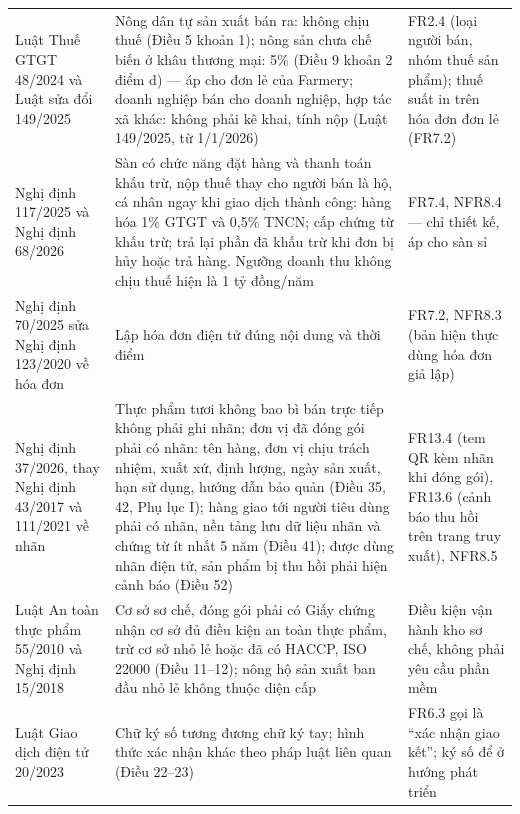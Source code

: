 \begin{longtable}{L{3.50cm} L{6.70cm} L{4.70cm}}
Luật Thuế GTGT 48/2024 và Luật sửa đổi 149/2025 \parencite{luatgtgt2024, luat149_2025} & Nông dân tự sản xuất bán ra: không chịu thuế (Điều 5 khoản 1); nông sản chưa chế biến ở khâu thương mại: 5\% (Điều 9 khoản 2 điểm d) --- áp cho đơn lẻ của Farmery; doanh nghiệp bán cho doanh nghiệp, hợp tác xã khác: không phải kê khai, tính nộp (Luật 149/2025, từ 1/1/2026) & FR2.4 (loại người bán, nhóm thuế sản phẩm); thuế suất in trên hóa đơn đơn lẻ (FR7.2) \\
Nghị định 117/2025 và Nghị định 68/2026 \parencite{nd117_2025, nd68_2026} & Sàn có chức năng đặt hàng và thanh toán khấu trừ, nộp thuế thay cho người bán là hộ, cá nhân ngay khi giao dịch thành công: hàng hóa 1\% GTGT và 0,5\% TNCN; cấp chứng từ khấu trừ; trả lại phần đã khấu trừ khi đơn bị hủy hoặc trả hàng. Ngưỡng doanh thu không chịu thuế hiện là 1 tỷ đồng/năm \parencite{nd141_2026} & FR7.4, NFR8.4 --- chỉ thiết kế, áp cho sàn sỉ \\
Nghị định 70/2025 sửa Nghị định 123/2020 về hóa đơn \parencite{nd70_2025} & Lập hóa đơn điện tử đúng nội dung và thời điểm & FR7.2, NFR8.3 (bản hiện thực dùng hóa đơn giả lập) \\
Nghị định 37/2026, thay Nghị định 43/2017 và 111/2021 về nhãn \parencite{nd37_2026} & Thực phẩm tươi không bao bì bán trực tiếp không phải ghi nhãn; đơn vị đã đóng gói phải có nhãn: tên hàng, đơn vị chịu trách nhiệm, xuất xứ, định lượng, ngày sản xuất, hạn sử dụng, hướng dẫn bảo quản (Điều 35, 42, Phụ lục I); hàng giao tới người tiêu dùng phải có nhãn, nền tảng lưu dữ liệu nhãn và chứng từ ít nhất 5 năm (Điều 41); được dùng nhãn điện tử, sản phẩm bị thu hồi phải hiện cảnh báo (Điều 52) & FR13.4 (tem QR kèm nhãn khi đóng gói), FR13.6 (cảnh báo thu hồi trên trang truy xuất), NFR8.5 \\
Luật An toàn thực phẩm 55/2010 và Nghị định 15/2018 \parencite{luat_attp_2010, nd15_2018} & Cơ sở sơ chế, đóng gói phải có Giấy chứng nhận cơ sở đủ điều kiện an toàn thực phẩm, trừ cơ sở nhỏ lẻ hoặc đã có HACCP, ISO 22000 (Điều 11--12); nông hộ sản xuất ban đầu nhỏ lẻ không thuộc diện cấp & Điều kiện vận hành kho sơ chế, không phải yêu cầu phần mềm \\
Luật Giao dịch điện tử 20/2023 \parencite{luatgddt2023} & Chữ ký số tương đương chữ ký tay; hình thức xác nhận khác theo pháp luật liên quan (Điều 22--23) & FR6.3 gọi là ``xác nhận giao kết''; ký số để ở hướng phát triển \\
\end{longtable}
\endgroup

